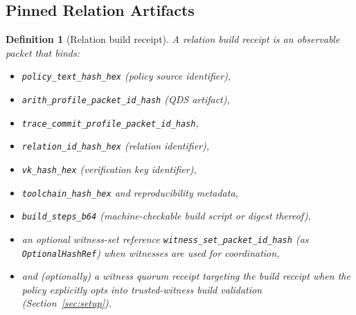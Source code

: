 \documentclass[11pt]{article}
\newtheorem{definition}{Definition}
\begin{document}
\subsection{Pinned Relation Artifacts}

\begin{definition}[Relation build receipt]
A relation build receipt is an observable packet that binds:
\begin{itemize}[leftmargin=1.2em]
  \item \texttt{policy\_text\_hash\_hex} (policy source identifier),
  \item \texttt{arith\_profile\_packet\_id\_hash} (QDS artifact),
  \item \texttt{trace\_commit\_profile\_packet\_id\_hash},
  \item \texttt{relation\_id\_hash\_hex} (relation identifier),
  \item \texttt{vk\_hash\_hex} (verification key identifier),
  \item \texttt{toolchain\_hash\_hex} and reproducibility metadata,
  \item \texttt{build\_steps\_b64} (machine-checkable build script or digest thereof),
  \item an optional witness-set reference \texttt{witness\_set\_packet\_id\_hash} (as \texttt{OptionalHashRef}) when witnesses are used for coordination,
  \item and (optionally) a witness quorum receipt targeting the build receipt when the policy explicitly opts into trusted-witness build validation (Section~\ref{sec:setup}).
\end{itemize}
\end{definition}
\end{document}
